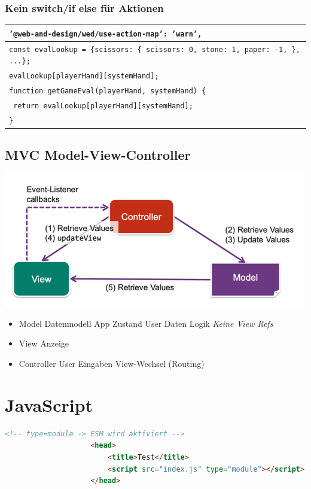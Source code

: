 \documentclass[a4paper, landscape, 8pt]{scrartcl}
\begin{document}
\begin{multicols*}{4}
        \subsubsection{Kein switch/if else für Aktionen}
        \begin{tabularx}{\columnwidth}{X}
            \texttt{'@web-and-design/wed/use-action-map': 'warn',} \\
            \hline
            \texttt{const evalLookup = \{scissors: \{ scissors: 0, stone: 1, paper: -1, \}, ...\};} \\
            \texttt{evalLookup[playerHand][systemHand];} \\
            \hline
            \texttt{function getGameEval(playerHand, systemHand) \{} \\
            \texttt{ return evalLookup[playerHand][systemHand];} \\
            \texttt{\}}
        \end{tabularx}

        \subsection{MVC {\tiny Model-View-Controller}}
        \includegraphics[scale=0.3]{graphic/33-mvc}
        \begin{itemize}
            \item Model
            \subitem Datenmodell
            \subitem App Zustand
            \subitem User Daten
            \subitem Logik
            \subitem \textit{Keine View Refs}
            \item View
            \subitem Anzeige
            \item Controller
            \subitem User Eingaben
            \subitem View-Wechsel (Routing)
        \end{itemize}

        \section{JavaScript}
        \begin{lstlisting}[language=HTML]
                    <!-- type=module -> ESM wird aktiviert -->
                    <head>
                        <title>Test</title>
                        <script src="index.js" type="module"></script>
                    </head>
        \end{lstlisting}


\end{multicols*}
\end{document}
